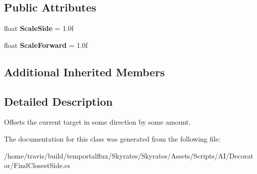 \subsection*{Public Attributes}
\begin{DoxyCompactItemize}
\item 
\hypertarget{class_skyrates_1_1_a_i_1_1_decorator_1_1_find_closest_side_a60b6a577d0487354c6b1b01ffdf37469}{float {\bfseries Scale\-Side} = 1.\-0f}\label{class_skyrates_1_1_a_i_1_1_decorator_1_1_find_closest_side_a60b6a577d0487354c6b1b01ffdf37469}

\item 
\hypertarget{class_skyrates_1_1_a_i_1_1_decorator_1_1_find_closest_side_a5083ca2479feacd0896cd57ef65060bb}{float {\bfseries Scale\-Forward} = 1.\-0f}\label{class_skyrates_1_1_a_i_1_1_decorator_1_1_find_closest_side_a5083ca2479feacd0896cd57ef65060bb}

\end{DoxyCompactItemize}
\subsection*{Additional Inherited Members}


\subsection{Detailed Description}
Offsets the current target in some direction by some amount. 



The documentation for this class was generated from the following file\-:\begin{DoxyCompactItemize}
\item 
/home/travis/build/temportalflux/\-Skyrates/\-Skyrates/\-Assets/\-Scripts/\-A\-I/\-Decorator/Find\-Closest\-Side.\-cs\end{DoxyCompactItemize}
